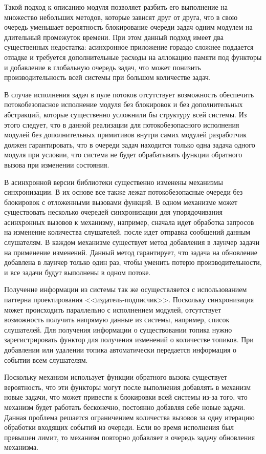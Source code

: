 Такой подход к описанию модуля позволяет разбить его выполнение 
на множество небольших методов, которые зависят друг от друга, 
что в свою очередь уменьшает вероятность блокирование очереди 
задач одним модулем на длительный промежуток времени. При этом 
данный подход имеет два существенных недостатка: асинхронное 
приложение гораздо сложнее поддается отладке и требуется 
дополнительные расходы на аллокацию памяти под функторы и 
добавление в глобальную очередь задач, что может понизить 
производительность всей системы при большом количестве задач.

В случае исполнения задач в пуле потоков отсутствует возможность обеспечить потокобезопасное исполнение модуля без блокировок и без дополнительных абстракций, которые существенно усложнили бы структуру всей системы. Из этого следует, что в данной реализации для потокобезопасного исполнения модулей без дополнительных примитивов внутри самих модулей разработчик должен гарантировать, что в очереди задач находится только одна задача одного модуля при условии, что система не будет обрабатывать функции обратного вызова при изменении состояния.

В асинхронной версии библиотеки существенно изменены механизмы 
синхронизации. В их основе все также лежат потокобезопасные 
очереди без блокировок с отложенными вызовами функций. В одном 
механизме может существовать несколько очередей синхронизации 
для упорядочивания асинхронных вызовов к механизму, например, 
сначала идет обработка запросов на изменение количества 
слушателей, после идет отправка сообщений данным слушателям. В 
каждом механизме существует метод добавления в лаунчер задачи на 
применение изменений. Данный метод гарантирует, что задача на 
обновление добавлена в лаунчер только один раз, чтобы уменить 
потерю производительности, и все задачи будут выполнены в одном 
потоке.

Получение информации из системы так же осуществляется с 
использованием паттерна проектирования <<издатель-подписчик>>. 
Поскольку синхронизация может происходить параллельно с 
исполнением модулей, отсутствует возможность получить напрямую 
данные из системы, например, список слушателей. Для получения 
информации о существовании топика нужно зарегистрировать функтор 
для получения изменений о количестве топиков. При добавлении или 
удалении топика автоматически передается информация о событии 
всем слушателям.

Поскольку механизм использует функции обратного вызова существует вероятность, что эти функторы могут после выполнения добавлять в механизм новые задачи, что может привести к блокировки всей системы из-за того, что механизм будет работать бесконечно, постоянно добавляя себе новые задачи. Данная проблема решается ограничением количества вызовов за одну итерацию обработки входящих событий из очереди. Если во время исполнения был превышен лимит, то механизм повторно добавляет в очередь задачу обновления механизма.

